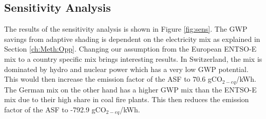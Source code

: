 


 


\subsection{Sensitivity Analysis}

The results of the sensitivity analysis is shown in Figure \ref{fig:sens}. The GWP savings from adaptive shading is dependent on the electricity mix as explained in Section \ref{ch:Meth:Opp}. Changing our assumption from the European ENTSO-E mix to a country specific mix brings interesting results. In Switzerland, the mix is dominated by hydro and nuclear power which has a very low GWP potential\cite{itten2012life}. This would then increase the emission factor of the ASF to 70.6 gCO$_{2-eq}$/kWh.
The German mix on the other hand has a higher GWP mix than the ENTSO-E mix due to their high share in coal fire plants. This then reduces the emission factor of the ASF to -792.9 gCO$_{2-eq}$/kWh.\\

